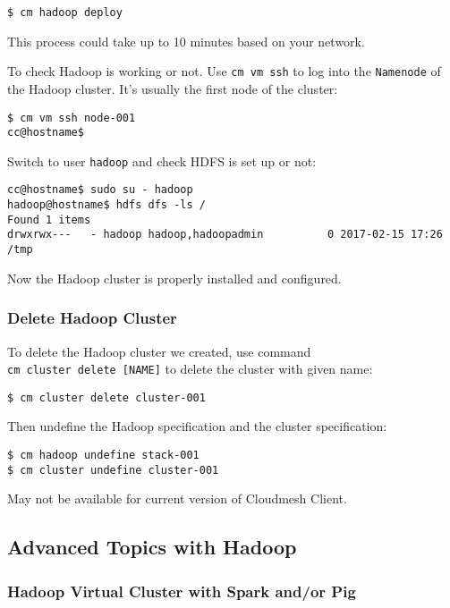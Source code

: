 \begin{verbatim}
$ cm hadoop deploy
\end{verbatim}

This process could take up to 10 minutes based on your network.

To check Hadoop is working or not. Use \texttt{cm\ vm\ ssh} to log into
the \texttt{Namenode} of the Hadoop cluster. It's usually the first node
of the cluster:

\begin{verbatim}
$ cm vm ssh node-001
cc@hostname$
\end{verbatim}

Switch to user \texttt{hadoop} and check HDFS is set up or not:

\begin{verbatim}
cc@hostname$ sudo su - hadoop
hadoop@hostname$ hdfs dfs -ls /
Found 1 items
drwxrwx---   - hadoop hadoop,hadoopadmin          0 2017-02-15 17:26 /tmp
\end{verbatim}

Now the Hadoop cluster is properly installed and configured.

\subsubsection{Delete Hadoop Cluster}\label{delete-hadoop-cluster}

To delete the Hadoop cluster we created, use command
\texttt{cm\ cluster\ delete\ {[}NAME{]}} to delete the cluster with
given name:

\begin{verbatim}
$ cm cluster delete cluster-001
\end{verbatim}

Then undefine the Hadoop specification and the cluster specification:

\begin{verbatim}
$ cm hadoop undefine stack-001
$ cm cluster undefine cluster-001
\end{verbatim}

May not be available for current version of Cloudmesh Client.

\subsection{Advanced Topics with
Hadoop}\label{advanced-topics-with-hadoop}

\subsubsection{Hadoop Virtual Cluster with Spark and/or
Pig}\label{hadoop-virtual-cluster-with-spark-andor-pig}

